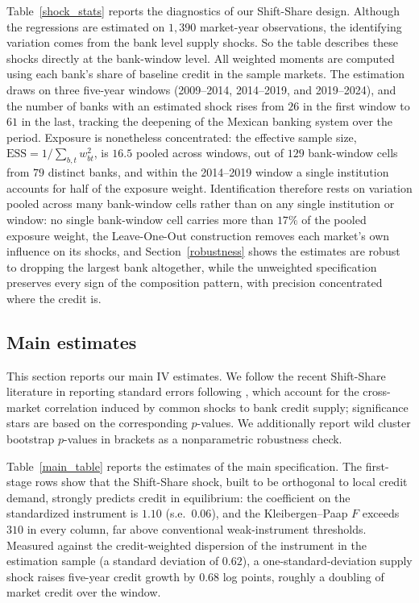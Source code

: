 \documentclass[12pt]{article}
\begin{document}
Table~\ref{shock_stats} reports the \citet{borusyak2022quasi} diagnostics of our Shift-Share design. Although the regressions are estimated on $1{,}390$ market-year observations, the identifying variation comes from the bank level supply shocks. So the table describes these shocks directly at the bank-window level. All weighted moments are computed using each bank's share of baseline credit in the sample markets. The estimation draws on three five-year windows (2009--2014, 2014--2019, and 2019--2024), and the number of banks with an estimated shock rises from $26$ in the first window to $61$ in the last, tracking the deepening of the Mexican banking system over the period. Exposure is nonetheless concentrated: the effective sample size, $\mathrm{ESS}=1/\sum_{b,t} w_{bt}^{2}$, is $16.5$ pooled across windows, out of $129$ bank-window cells from $79$ distinct banks, and within the 2014--2019 window a single institution accounts for half of the exposure weight. Identification therefore rests on variation pooled across many bank-window cells rather than on any single institution or window: no single bank-window cell carries more than $17\%$ of the pooled exposure weight, the Leave-One-Out construction removes each market's own influence on its shocks, and Section~\ref{robustness} shows the estimates are robust to dropping the largest bank altogether, while the unweighted specification preserves every sign of the composition pattern, with precision concentrated where the credit is.

\begin{table}[H]
    \caption{Descriptive statistics of the standardized bank shocks}
    \label{shock_stats}
    \centering
    \small
    
\end{table}

\subsection{Main estimates}

This section reports our main IV estimates. We follow the recent Shift-Share literature in reporting standard errors following \citet{adao2019shiftshare}, which account for the cross-market correlation induced by common shocks to bank credit supply; significance stars are based on the corresponding $p$-values. We additionally report wild cluster bootstrap $p$-values in brackets \citep{cameron2008bootstrap} as a nonparametric robustness check. 

Table~\ref{main_table} reports the estimates of the main specification. The first-stage rows show that the Shift-Share shock, built to be orthogonal to local credit demand, strongly predicts credit in equilibrium: the coefficient on the standardized instrument is $1.10$ (s.e.\ $0.06$), and the Kleibergen--Paap $F$ exceeds $310$ in every column, far above conventional weak-instrument thresholds. Measured against the credit-weighted dispersion of the instrument in the estimation sample (a standard deviation of $0.62$), a one-standard-deviation supply shock raises five-year credit growth by $0.68$ log points, roughly a doubling of market credit over the window.
\end{document}
